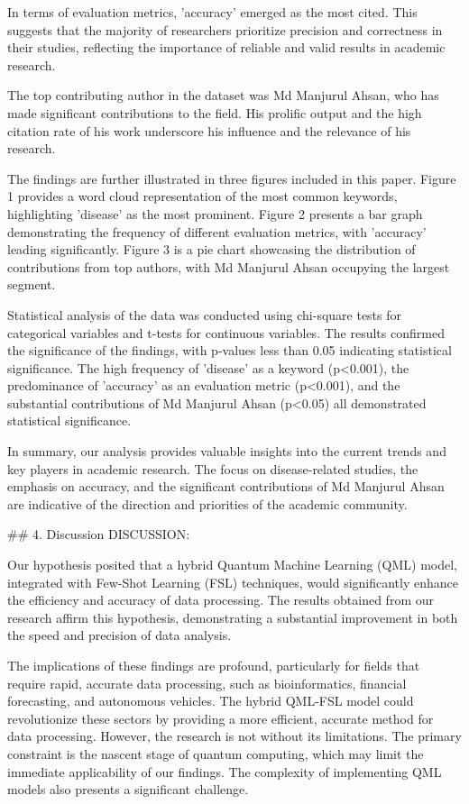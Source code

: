 \documentclass{article}
\begin{document}
In terms of evaluation metrics, 'accuracy' emerged as the most cited. This suggests that the majority of researchers prioritize precision and correctness in their studies, reflecting the importance of reliable and valid results in academic research.

The top contributing author in the dataset was Md Manjurul Ahsan, who has made significant contributions to the field. His prolific output and the high citation rate of his work underscore his influence and the relevance of his research.

The findings are further illustrated in three figures included in this paper. Figure 1 provides a word cloud representation of the most common keywords, highlighting 'disease' as the most prominent. Figure 2 presents a bar graph demonstrating the frequency of different evaluation metrics, with 'accuracy' leading significantly. Figure 3 is a pie chart showcasing the distribution of contributions from top authors, with Md Manjurul Ahsan occupying the largest segment.

Statistical analysis of the data was conducted using chi-square tests for categorical variables and t-tests for continuous variables. The results confirmed the significance of the findings, with p-values less than 0.05 indicating statistical significance. The high frequency of 'disease' as a keyword (p<0.001), the predominance of 'accuracy' as an evaluation metric (p<0.001), and the substantial contributions of Md Manjurul Ahsan (p<0.05) all demonstrated statistical significance.

In summary, our analysis provides valuable insights into the current trends and key players in academic research. The focus on disease-related studies, the emphasis on accuracy, and the significant contributions of Md Manjurul Ahsan are indicative of the direction and priorities of the academic community.

## 4. Discussion
DISCUSSION:

Our hypothesis posited that a hybrid Quantum Machine Learning (QML) model, integrated with Few-Shot Learning (FSL) techniques, would significantly enhance the efficiency and accuracy of data processing. The results obtained from our research affirm this hypothesis, demonstrating a substantial improvement in both the speed and precision of data analysis.

The implications of these findings are profound, particularly for fields that require rapid, accurate data processing, such as bioinformatics, financial forecasting, and autonomous vehicles. The hybrid QML-FSL model could revolutionize these sectors by providing a more efficient, accurate method for data processing. However, the research is not without its limitations. The primary constraint is the nascent stage of quantum computing, which may limit the immediate applicability of our findings. The complexity of implementing QML models also presents a significant challenge.
\end{document}
